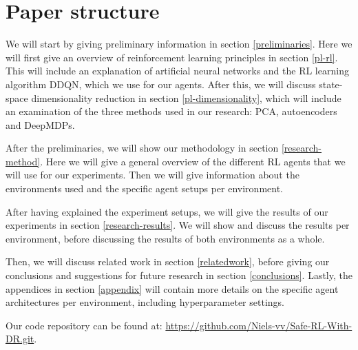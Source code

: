 \section{Paper structure}
We will start by giving preliminary information in section \ref{preliminaries}. Here we will first give an overview of reinforcement learning principles in section \ref{pl-rl}. This will include an explanation of artificial neural networks and the RL learning algorithm DDQN, which we use for our agents. After this, we will discuss state-space dimensionality reduction in section \ref{pl-dimensionality}, which will include an examination of the three methods used in our research: PCA, autoencoders and DeepMDPs.

After the preliminaries, we will show our methodology in section \ref{research-method}. Here we will give a general overview of the different RL agents that we will use for our experiments. Then we will give information about the environments used and the specific agent setups per environment. 

After having explained the experiment setups, we will give the results of our experiments in section \ref{research-results}. We will show and discuss the results per environment, before discussing the results of both environments as a whole.

Then, we will discuss related work in section \ref{relatedwork}, before giving our conclusions and suggestions for future research in section \ref{conclusions}. Lastly, the appendices in section \ref{appendix} will contain more details on the specific agent architectures per environment, including hyperparameter settings.

Our code repository can be found at: \url{https://github.com/Niels-vv/Safe-RL-With-DR.git}.